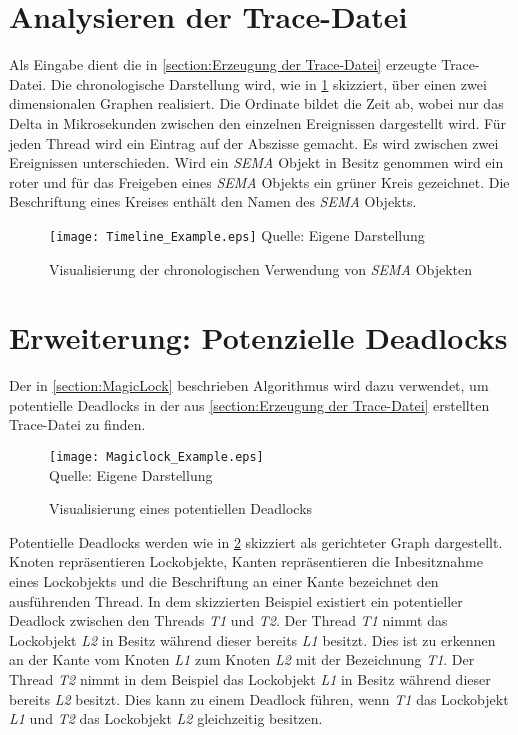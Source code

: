 \section{Analysieren der Trace-Datei}
\label{section:Analysieren der Trace-Datei}
Als Eingabe dient die in \cref{section:Erzeugung der Trace-Datei} erzeugte
Trace-Datei. Die chronologische Darstellung wird, wie in
\cref{fig:Timeline_Example} skizziert, über einen zwei dimensionalen Graphen
realisiert. Die Ordinate bildet die Zeit ab, wobei nur das Delta in
Mikrosekunden zwischen den einzelnen Ereignissen dargestellt wird. Für jeden
Thread wird ein Eintrag auf der Abszisse gemacht. Es wird zwischen zwei
Ereignissen unterschieden. Wird ein \emph{SEMA} Objekt in Besitz genommen wird
ein roter und für das Freigeben eines \emph{SEMA} Objekts ein grüner Kreis
gezeichnet. Die Beschriftung eines Kreises enthält den Namen des \emph{SEMA}
Objekts.
\begin{figure}[ht]
  \texttt{[image: Timeline\_Example.eps]}
  \footnotesize\sffamily Quelle: Eigene Darstellung
  \caption{Visualisierung der chronologischen Verwendung von \emph{SEMA} Objekten}
  \label{fig:Timeline_Example}
\end{figure}

\section{Erweiterung: Potenzielle Deadlocks}
\label{section:Erweiterung: Potenzielle Deadlocks}
Der in \cref{section:MagicLock} beschrieben Algorithmus wird dazu verwendet, um
potentielle Deadlocks in der aus \cref{section:Erzeugung der Trace-Datei}
erstellten Trace-Datei zu finden. 
\begin{figure}[ht]
  \texttt{[image: Magiclock\_Example.eps]} 
  \\
  \footnotesize\sffamily Quelle: Eigene Darstellung
  \caption{Visualisierung eines potentiellen Deadlocks}
  \label{fig:Magiclock_Example}
\end{figure}

Potentielle Deadlocks werden wie in \cref{fig:Magiclock_Example} skizziert als
gerichteter Graph dargestellt. Knoten repräsentieren Lockobjekte, Kanten
repräsentieren die Inbesitznahme eines Lockobjekts und die Beschriftung an einer
Kante bezeichnet den ausführenden Thread. In dem skizzierten Beispiel existiert
ein potentieller Deadlock zwischen den Threads \emph{T1} und \emph{T2}. Der
Thread \emph{T1} nimmt das Lockobjekt \emph{L2} in Besitz während dieser bereits
\emph{L1} besitzt. Dies ist zu erkennen an der Kante vom Knoten \emph{L1} zum
Knoten \emph{L2} mit der Bezeichnung \emph{T1}. Der Thread \emph{T2} nimmt in
dem Beispiel das Lockobjekt \emph{L1} in Besitz während dieser bereits \emph{L2}
besitzt. Dies kann zu einem Deadlock führen, wenn \emph{T1} das Lockobjekt
\emph{L1} und \emph{T2} das Lockobjekt \emph{L2} gleichzeitig besitzen.